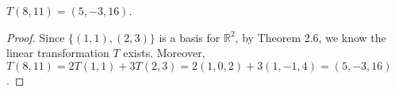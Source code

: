 \begin{Exercise}
\begin{answer}
$T(8,11) = (5,-3,16)$.
\end{answer}
\begin{proof}
Since $\{(1,1),(2,3)\}$ is a basis for $\mathbb{R}^2$, by Theorem 2.6, we know the linear transformation $T$ exists.
Moreover, $T(8,11) = 2T(1,1)+3T(2,3) = 2(1,0,2)+3(1,-1,4) = (5,-3,16)$.
\end{proof}
\end{Exercise}